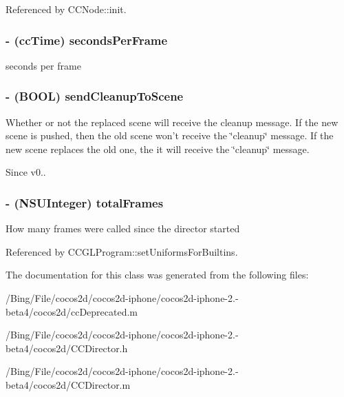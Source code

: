 Referenced by C\-C\-Node\-::init.

\hypertarget{class_c_c_director_a751c1b06838dcfb33fda37c4d93168da}{
\subsubsection[{seconds\-Per\-Frame}]{\setlength{\rightskip}{0pt plus 5cm}-\/ ({\bf cc\-Time}) {\bf seconds\-Per\-Frame}}}\label{class_c_c_director_a751c1b06838dcfb33fda37c4d93168da}
seconds per frame \hypertarget{class_c_c_director_a767522c54be75808c90a4ef23b4a56e9}{
\subsubsection[{send\-Cleanup\-To\-Scene}]{\setlength{\rightskip}{0pt plus 5cm}-\/ (B\-O\-O\-L) {\bf send\-Cleanup\-To\-Scene}}}\label{class_c_c_director_a767522c54be75808c90a4ef23b4a56e9}
Whether or not the replaced scene will receive the cleanup message. If the new scene is pushed, then the old scene won't receive the \char`\"{}cleanup\char`\"{} message. If the new scene replaces the old one, the it will receive the \char`\"{}cleanup\char`\"{} message. \begin{DoxySince}{Since}
v0.. 
\end{DoxySince}
\hypertarget{class_c_c_director_aec2768ee5ab8900069df6ede35f2fe91}{
\subsubsection[{total\-Frames}]{\setlength{\rightskip}{0pt plus 5cm}-\/ (N\-S\-U\-Integer) {\bf total\-Frames}}}\label{class_c_c_director_aec2768ee5ab8900069df6ede35f2fe91}
How many frames were called since the director started 

Referenced by C\-C\-G\-L\-Program\-::set\-Uniforms\-For\-Builtins.



The documentation for this class was generated from the following files\-:\begin{DoxyCompactItemize}
\item 
/\-Bing/\-File/cocos2d/cocos2d-\/iphone/cocos2d-\/iphone-\/2.-\/beta4/cocos2d/cc\-Deprecated.\-m\item 
/\-Bing/\-File/cocos2d/cocos2d-\/iphone/cocos2d-\/iphone-\/2.-\/beta4/cocos2d/C\-C\-Director.\-h\item 
/\-Bing/\-File/cocos2d/cocos2d-\/iphone/cocos2d-\/iphone-\/2.-\/beta4/cocos2d/C\-C\-Director.\-m\end{DoxyCompactItemize}
